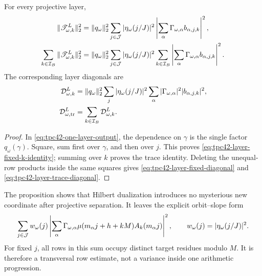 \begin{proposition}
\label{prop:tpc42-projective-layer-reduction}
For every projective layer,
\begin{align}
 \|\mathscr T_{\omega,k}^L\|_2^2
 &=\|q_\omega\|_2^2
   \sum_{j\in\mathcal J}
   |\eta_\omega(j/J)|^2
   \left|
    \sum_\alpha\Gamma_{\omega,\alpha}b_{\alpha,j,k}
   \right|^2,
 \label{eq:tpc42-layer-fixed-k-identity}\\
 \sum_{k\in\mathcal I_B}\|\mathscr T_{\omega,k}^L\|_2^2
 &=\|q_\omega\|_2^2
   \sum_{j\in\mathcal J}|\eta_\omega(j/J)|^2
   \sum_{k\in\mathcal I_B}
   \left|
    \sum_\alpha\Gamma_{\omega,\alpha}b_{\alpha,j,k}
   \right|^2.
 \label{eq:tpc42-layer-trace-identity}
\end{align}
The corresponding layer diagonals are
\begin{align}
 \mathcal D_{\omega,k}^L
 &=\|q_\omega\|_2^2
   \sum_j|\eta_\omega(j/J)|^2
   \sum_\alpha
   |\Gamma_{\omega,\alpha}|^2|b_{\alpha,j,k}|^2,
 \label{eq:tpc42-layer-fixed-diagonal}\\
 \mathcal D_{\omega,\rm tr}^L
 &=\sum_{k\in\mathcal I_B}\mathcal D_{\omega,k}^L.
 \label{eq:tpc42-layer-trace-diagonal}
\end{align}
\end{proposition}

\begin{proof}
In \eqref{eq:tpc42-one-layer-output}, the dependence on \(\gamma\) is the
single factor \(q_\omega(\gamma)\).  Square, sum first over \(\gamma\),
and then over \(j\).  This proves
\eqref{eq:tpc42-layer-fixed-k-identity}; summing over \(k\) proves the
trace identity.  Deleting the unequal-row products inside the same
squares gives \eqref{eq:tpc42-layer-fixed-diagonal} and
\eqref{eq:tpc42-layer-trace-diagonal}.
\end{proof}

The proposition shows that Hilbert dualization introduces no mysterious
new coordinate after projective separation.  It leaves the explicit
orbit--slope form
\begin{equation}
 \sum_{j\in\mathcal J}w_\omega(j)
 \left|
  \sum_\alpha\Gamma_{\omega,\alpha}
  \mu(m_\alpha j+h+kM)
  A_k(m_\alpha j)
 \right|^2,
 \qquad
 w_\omega(j)=|\eta_\omega(j/J)|^2.
 \label{eq:tpc42-orbit-slope-form}
\end{equation}
For fixed \(j\), all rows in this sum occupy distinct target residues
modulo \(M\).  It is therefore a transversal row estimate, not a variance
inside one arithmetic progression.

